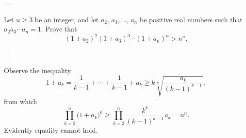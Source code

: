 
---

Let $n\ge3$ be an integer, and let $a_2$, $a_3$, \ldots, $a_n$ be positive real numbers such that $a_2a_3\cdots a_n=1$. Prove that
\[(1+a_2)^2(1+a_3)^3\cdots(1+a_n)^n>n^n.\]

---

Observe the inequality
\[1+a_k=\frac1{k-1}+\cdots+\frac1{k-1}+a_k\ge k\sqrt[k]{\frac{a_k}{(k-1)^{k-1}}},\]
from which
\[\prod_{k=2}^n\big(1+a_k\big)^k\ge\prod_{k=2}^n\frac{k^k}{(k-1)^{k-1}}a_k=n^n.\]
Evidently equality cannot hold.



